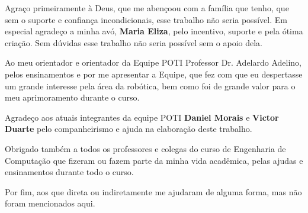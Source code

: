 \begin{agradecimentos}

Agraço primeiramente à Deus, que me abençoou com a família que tenho, que sem o suporte e confiança incondicionais, esse trabalho não seria possível. Em especial agradeço a minha avó, \textbf{Maria Eliza}, pelo incentivo, suporte e pela ótima criação. Sem dúvidas esse trabalho não seria possível sem o apoio dela.

Ao meu orientador e orientador da Equipe POTI Professor Dr. Adelardo Adelino, pelos ensinamentos e por me apresentar a Equipe, que fez com que eu despertasse um grande interesse pela área da robótica, bem como foi de grande valor para o meu aprimoramento durante o curso.

Agradeço aos atuais integrantes da equipe POTI \textbf{Daniel Morais} e \textbf{Victor Duarte} pelo companheirismo e ajuda na elaboração deste trabalho.

Obrigado também a todos os professores e colegas do curso de Engenharia de Computação que fizeram ou fazem parte da minha vida acadêmica, pelas ajudas e ensinamentos durante todo o curso.

Por fim, aos que direta ou indiretamente me ajudaram de alguma forma, mas não foram mencionados aqui.
\end{agradecimentos}